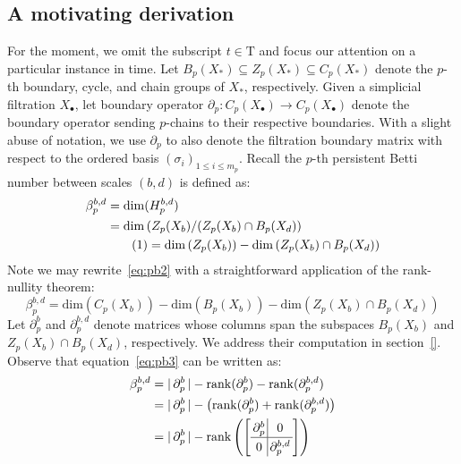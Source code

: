 \documentclass[10pt]{article}
\newcommand\numberthis{\addtocounter{equation}{1}\tag{\theequation}}
\begin{document}
\subsection*{A motivating derivation}
For the moment, we omit the subscript $t \in \mathrm{T}$ and focus our attention on a particular instance in time. Let $B_p(X_\ast) \subseteq Z_p(X_\ast) \subseteq C_p(X_\ast)$ denote the $p$-th boundary, cycle, and chain groups of $X_\ast$, respectively. 
Given a simplicial filtration $X_{\bullet}$, let boundary operator $\partial_p : C_p( X_{\bullet}) \to C_p(X_{\bullet})$ denote the boundary operator sending $p$-chains to their respective boundaries. 
With a slight abuse of notation, we use $\partial_p$ to also denote the filtration boundary matrix with respect to the ordered basis $(\sigma_i)_{1 \leq i \leq m_p}$.  
Recall the $p$-th persistent Betti number between scales $(b,d)$ is defined as: 
\begin{align*}
	\beta_p^{b,d} &= \mathrm{dim}(H_p^{b,d}) \\
	&= \mathrm{dim} \left( Z_p(X_b) / (Z_p(X_b) \cap B_p(X_d) \right) \\
	& \numberthis = \mathrm{dim} \left( Z_p(X_b) \right) - \mathrm{dim}\left( Z_p(X_b) \cap B_p(X_d) \right ) \label{eq:pb2}
\end{align*}
Note we may rewrite~\eqref{eq:pb2} with a straightforward application of the rank-nullity theorem:
\begin{equation} \label{eq:pb3}
\beta_p^{b,d} = \mathrm{dim} \left( C_p(X_b) \right) - \mathrm{dim} \left( B_p(X_b) \right) - \mathrm{dim}\left( Z_p(X_b) \cap B_p(X_d) \right )  
\end{equation}
Let $\partial_p^{b}$ and $\partial_p^{b, d}$ denote matrices whose columns span the subspaces $B_p(X_b)$ and $Z_p(X_b) \cap B_p(X_d)$, respectively. We address their computation in section~\eqref{}. Observe that equation~\eqref{eq:pb3} can be written as: 
\begin{align}
	\beta_p^{b,d} &= \lvert \, \partial_p^b \, \rvert - \mathrm{rank}(\partial_p^b) - \mathrm{rank}(\partial_p^{b,d}) \\
	&= \lvert \, \partial_p^b \, \rvert - \left( \mathrm{rank}(\partial_p^b) + \mathrm{rank}(\partial_p^{b,d}) \right) \\
	&=
	\lvert \, \partial_p^b \, \rvert - 
	\arraycolsep=1.8pt\def\arraystretch{1.25}
	\mathrm{rank}\left(\left[\begin{array}{c|c}
 		\partial_p^{b} & 0 \\
		\hline
		0 & \partial_p^{b,d}
	\end{array}\right] \right) \label{eq:block_pb}
\end{align}
\end{document}
